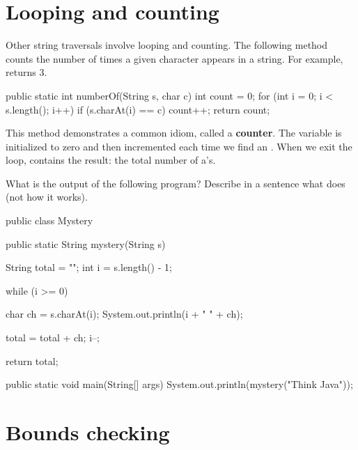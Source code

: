 \section{Looping and counting}
\label{loopcount}


Other string traversals involve looping and counting.
The following method counts the number of times a given character appears in a string.
For example,  returns 3.

\begin{code}
    public static int numberOf(String s, char c) {
        int count = 0;
        for (int i = 0; i < s.length(); i++) {
            if (s.charAt(i) == c) {
                count++;
            }
        }
        return count;
    }
\end{code}


This method demonstrates a common idiom, called a {\bf counter}.
The variable  is initialized to zero and then incremented each time we find an .
When we exit the loop,  contains the result: the total number of a's.


\begin{exercise}

What is the output of the following program?
Describe in a sentence what  does (not how it works).

\begin{code}
public class Mystery {

    public static String mystery(String s) {
        String total = "";
        int i = s.length() - 1;

        while (i >= 0) {
            char ch = s.charAt(i);
            System.out.println(i + "     " + ch);

            total = total + ch;
            i--;
        }
        return total;
    }

    public static void main(String[] args) {
        System.out.println(mystery("Think Java"));
    }

}
\end{code}

\end{exercise}


\section{Bounds checking}
\label{StringIndexOutOfBounds}


